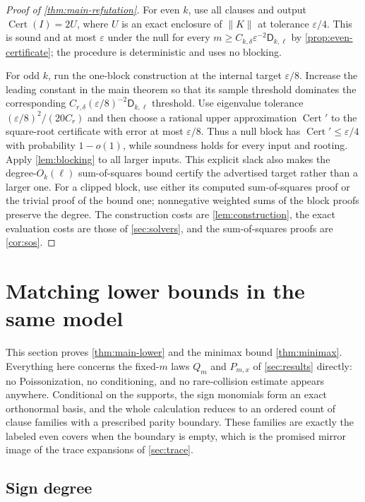\documentclass[11pt]{article}
\theoremstyle{definition}
\theoremstyle{remark}
\newcommand{\1}{\mathbf 1}
\newcommand{\eps}{\varepsilon}
\newcommand{\Dkl}{\mathsf D_{k,\ell}}
\DeclareMathOperator{\Cert}{Cert}
\numberwithin{equation}{section}
\begin{document}
\begin{proof}[Proof of \cref{thm:main-refutation}]
For even $k$, use all clauses and output $\Cert(I)=2U$, where $U$ is
an exact enclosure of $\|K\|$ at tolerance $\eps/4$.  This is sound and
at most $\eps$ under the null for every
$m\ge C_{k,\delta}\eps^{-2}\Dkl$ by
\cref{prop:even-certificate}; the procedure is deterministic and uses no
blocking.

For odd $k$, run the one-block construction at the internal target
$\eps/8$.  Increase the leading constant in the main theorem so that its
sample threshold dominates the corresponding
$C_{r,\delta}(\eps/8)^{-2}\Dkl$ threshold.  Use eigenvalue tolerance
$(\eps/8)^2/(20C_r)$ and then choose a rational upper approximation
$\Cert'$ to the square-root certificate with error at most $\eps/8$.
Thus a null block has $\Cert'\le\eps/4$ with probability $1-o(1)$,
while soundness holds for every input and rooting.  Apply
\cref{lem:blocking} to all larger inputs.  This explicit slack also makes
the degree-$O_k(\ell)$ sum-of-squares bound certify the advertised target
rather than a larger one.  For a clipped block, use either its computed
sum-of-squares proof or the trivial proof of the bound one; nonnegative
weighted sums of the block proofs preserve the degree.  The construction
costs are \cref{lem:construction}, the exact evaluation costs are those
of \cref{sec:solvers}, and the sum-of-squares proofs are \cref{cor:sos}.
\end{proof}

\section{Matching lower bounds in the same model}\label{sec:lower}

This section proves \cref{thm:main-lower} and the minimax bound
\cref{thm:minimax}.  Everything here concerns the fixed-$m$ laws $Q_m$
and $P_{m,x}$ of \cref{sec:results} directly: no Poissonization, no
conditioning, and no rare-collision estimate appears anywhere.
Conditional on the supports, the sign monomials form an exact
orthonormal basis, and the whole calculation reduces to an ordered count
of clause families with a prescribed parity boundary.  These families
are exactly the labeled even covers when the boundary is empty, which is
the promised mirror image of the trace expansions of \cref{sec:trace}.

\subsection{Sign degree}\label{sec:sign-degree}
\end{document}
